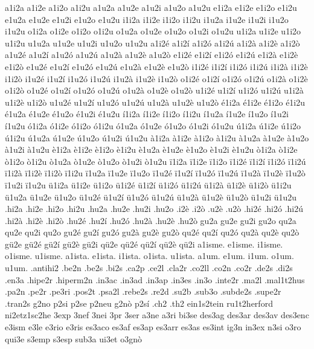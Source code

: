 {%
a1i2a a1i2e a1i2o a1i2u
a1u2a a1u2e a1u2i a1u2o a1u2u
e1i2a e1i2e e1i2o e1i2u
e1u2a e1u2e e1u2i e1u2o e1u2u
i1i2a i1i2e i1i2o i1i2u
i1u2a i1u2e i1u2i i1u2o i1u2u
o1i2a o1i2e o1i2o o1i2u
o1u2a o1u2e o1u2o o1u2i o1u2u
u1i2a u1i2e u1i2o u1i2u
u1u2a u1u2e u1u2i u1u2o u1u2u
a1i2é a1i2í a1i2ó a1i2ú a1i2à
a1i2è a1i2ò
a1u2é a1u2í a1u2ó a1u2ú a1u2à
a1u2è a1u2ò
e1i2é e1i2í e1i2ó e1i2ú e1i2à
e1i2è e1i2ò
e1u2é e1u2í e1u2ó e1u2ú e1u2à
e1u2è e1u2ò
i1i2é i1i2í i1i2ó i1i2ú i1i2à
i1i2è i1i2ò
i1u2é i1u2í i1u2ó i1u2ú i1u2à
i1u2è i1u2ò
o1i2é o1i2í o1i2ó o1i2ú o1i2à
o1i2è o1i2ò
o1u2é o1u2í o1u2ó o1u2ú o1u2à
o1u2è o1u2ò
u1i2é u1i2í u1i2ó u1i2ú u1i2à
u1i2è u1i2ò
u1u2é u1u2í u1u2ó u1u2ú u1u2à
u1u2è u1u2ò
é1i2a é1i2e é1i2o é1i2u
é1u2a é1u2e é1u2o é1u2i é1u2u
í1i2a í1i2e í1i2o í1i2u
í1u2a í1u2e í1u2o í1u2i í1u2u
ó1i2a ó1i2e ó1i2o ó1i2u
ó1u2a ó1u2e ó1u2o ó1u2i ó1u2u
ú1i2a ú1i2e ú1i2o ú1i2u
ú1u2a ú1u2e ú1u2o ú1u2i ú1u2u
à1i2a à1i2e à1i2o à1i2u
à1u2a à1u2e à1u2o à1u2i à1u2u
è1i2a è1i2e è1i2o è1i2u
è1u2a è1u2e è1u2o è1u2i è1u2u
ò1i2a ò1i2e ò1i2o ò1i2u
ò1u2a ò1u2e ò1u2o ò1u2i ò1u2u
ï1i2a ï1i2e ï1i2o ï1i2é ï1i2í
ï1i2ó
ï1i2ú ï1i2à
ï1i2è ï1i2ò ï1i2u
ï1u2a ï1u2e ï1u2o ï1u2é ï1u2í
ï1u2ó
ï1u2ú ï1u2à
ï1u2è ï1u2ò ï1u2i ï1u2u
ü1i2a ü1i2e ü1i2o ü1i2é ü1i2í
ü1i2ó
ü1i2ú ü1i2à
ü1i2è ü1i2ò ü1i2u
ü1u2a ü1u2e ü1u2o ü1u2é ü1u2í
ü1u2ó
ü1u2ú ü1u2à
ü1u2è ü1u2ò ü1u2i ü1u2u
%
.hi2a .hi2e .hi2o .hi2u .hu2a .hu2e .hu2i .hu2o
.i2è .i2ò
.u2è .u2ò
.hi2é .hi2ó .hi2ú .hi2à .hi2è
.hi2ò
.hu2é .hu2í .hu2ó .hu2à .hu2è
.hu2ò
%
gu2a gu2e gu2i gu2o qu2a qu2e qu2i qu2o
gu2é gu2í gu2ó gu2à gu2è
gu2ò
qu2é qu2í qu2ó qu2à qu2è
qu2ò
gü2e gü2é gü2í gü2è gü2i
qü2e qü2é qü2í qü2è qü2i
%
a1isme. e1isme. i1isme. o1isme. u1isme.
a1ista. e1ista. i1ista. o1ista. u1ista.
a1um. e1um. i1um. o1um. u1um.
%
.antihi2 .be2n .be2s .bi2s .ca2p .ce2l .cla2r .co2ll .co2n .co2r .de2s
.di2s .en3a .hipe2r .hiperm2n .in3ac .in3ad .in3ap .in3es .in3o
.inte2r .ma2l .mal1t2hus .pa2n .pe2r .pe3ri .pos2t .psa2l .rebe2s
.re2d .su2b .sub3o .subde2s .supe2r .tran2s
%
g2no p2si p2se p2neu
g2nò p2sí
%
.ch2 .th2
ein1s2tein ru1t2herford ni2etz1sc2he
%
3exp 3nef 3nei 3pr 3ser a3ne a3ri bi3se des3ag des3ar des3av des3enc
e3ism e3le e3rio e3ris es3aco es3af es3ap es3arr es3as es3int
ig3n in3ex n3si o3ro qui3e s3emp s3esp sub3a ui3et
o3gnò
}
